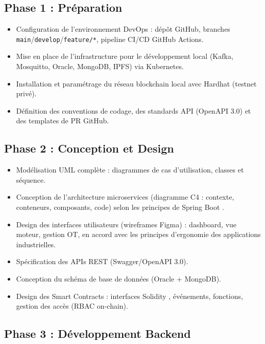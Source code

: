 \documentclass[12pt, a4paper, oneside]{report}
\begin{document}
\subsection{Phase 1 : Préparation}

\begin{itemize}
  \item Configuration de l'environnement DevOps : dépôt GitHub, branches \texttt{main}/\texttt{develop}/\texttt{feature/*}, pipeline CI/CD GitHub Actions.
  \item Mise en place de l'infrastructure pour le développement local (Kafka, Mosquitto, Oracle, MongoDB, IPFS) via Kubernetes.
  \item Installation et paramétrage du réseau blockchain local avec Hardhat \cite{hardhat} (testnet privé).
  \item Définition des conventions de codage, des standards API (OpenAPI 3.0) et des templates de PR GitHub.
\end{itemize}

\subsection{Phase 2 : Conception et Design}

\begin{itemize}
  \item Modélisation UML complète : diagrammes de cas d'utilisation, classes et séquence.
  \item Conception de l'architecture microservices (diagramme C4 : contexte, conteneurs,
  composants, code) selon les principes de Spring Boot \cite{springboot}.
  \item Design des interfaces utilisateurs (wireframes Figma) : dashboard, vue moteur, gestion OT,
  en accord avec les principes d'ergonomie des applications industrielles.
  \item Spécification des APIs REST (Swagger/OpenAPI 3.0).
  \item Conception du schéma de base de données (Oracle + MongoDB).
  \item Design des Smart Contracts : interfaces Solidity \cite{ethereum}, événements, fonctions,
  gestion des accès (RBAC on-chain).
\end{itemize}

\subsection{Phase 3 : Développement Backend}
\end{document}
